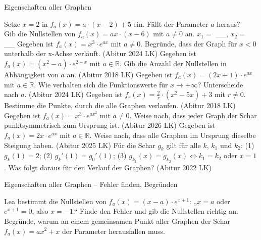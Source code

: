 \setcounter{aufgabe}{11}

\begin{aufgabe}{Eigenschaften aller Graphen}
\begin{teile}
\teil Setze $x = 2$ in $f_a(x) = a \cdot (x - 2) + 5$ ein. Fällt der Parameter $a$ heraus? \\  
\teil Gib die Nullstellen von $f_a(x) = a x \cdot (x - 6)$ mit $a \neq 0$ an. $x_1 =$ \_\_, $x_2 =$ \_\_
\teil Gegeben ist $f_a(x) = x^3 \cdot e^{a x}$ mit $a \neq 0$. Begründe, dass der Graph für $x < 0$ unterhalb der x-Achse verläuft. \hfill (Abitur 2024 LK)
\teil Gegeben ist $f_a(x) = (x^2 - a) \cdot e^{2 - x}$ mit $a \in \mathbb{R}$. Gib die Anzahl der Nullstellen in Abhängigkeit von $a$ an. \hfill (Abitur 2018 LK)
\teil Gegeben ist $f_a(x) = (2x + 1) \cdot e^{a x}$ mit $a \in \mathbb{R}$. Wie verhalten sich die Funktionswerte für $x \to +\infty$? Unterscheide nach $a$. \hfill (Abitur 2024 LK)
\teil Gegeben ist $f_r(x) = \frac{2}{r} \cdot (x^2 - 5x) + 3$ mit $r \neq 0$. Bestimme die Punkte, durch die alle Graphen verlaufen. \hfill (Abitur 2018 LK)
\teil Gegeben ist $f_a(x) = x^3 \cdot e^{a x^2}$ mit $a \neq 0$. Weise nach, dass jeder Graph der Schar punktsymmetrisch zum Ursprung ist. \hfill (Abitur 2026 LK)
\teil Gegeben ist $f_a(x) = 2x \cdot e^{a x}$ mit $a \in \mathbb{R}$. Weise nach, dass alle Graphen im Ursprung dieselbe Steigung haben. \hfill (Abitur 2025 LK)
\teil Für die Schar $g_k$ gilt für alle $k$, $k_1$ und $k_2$: (1) $g_k(1) = 2$; (2) $g_k'(1) = g_0'(1)$; (3) $g_{k_1}(x) = g_{k_2}(x) \Leftrightarrow k_1 = k_2$ oder $x = 1$. Was folgt daraus für den Verlauf der Graphen? \hfill (Abitur 2022 LK)
\end{teile}
\end{aufgabe}

\begin{aufgabe}{Eigenschaften aller Graphen – Fehler finden, Begründen}
\begin{teile}
\teil Lea bestimmt die Nullstellen von $f_a(x) = (x - a) \cdot e^{x + 1}$: „$x = a$ oder $e^{x + 1} = 0$, also $x = -1$.“ Finde den Fehler und gib die Nullstellen richtig an.
\teil Begründe, warum an einem gemeinsamen Punkt aller Graphen der Schar $f_a(x) = a x^2 + x$ der Parameter herausfallen muss.
\end{teile}
\end{aufgabe}
